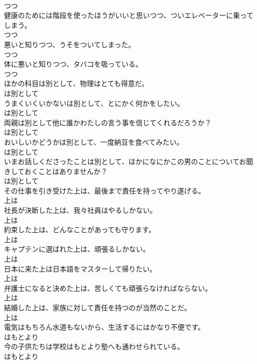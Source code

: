 \documentclass[8pt]{extreport}
\begin{document}
\begin{CJK}{UTF8}{min}
\\	つつ	
\\	健康のためには階段を使ったほうがいいと思いつつ、ついエレベーターに乗ってしまう。	
\\	つつ	
\\	悪いと知りつつ、うそをついてしまった。	
\\	つつ	
\\	体に悪いと知りつつ、タバコを吸っている。	
\\	つつ	
\\	ほかの科目は別として、物理はとても得意だ。	
\\	は別として	
\\	うまくいくいかないは別として、とにかく何かをしたい。	
\\	は別として	
\\	両親は別として他に誰かわたしの言う事を信じてくれるだろうか？	
\\	は別として	
\\	おいしいかどうかは別として、一度納豆を食べてみたい。	
\\	は別として	
\\	いまお話しくださったことは別として、ほかになにかこの男のことについてお聞きしておくことはありませんか？	
\\	は別として	
\\	その仕事を引き受けた上は、最後まで責任を持ってやり遂げる。	
\\	上は	
\\	社長が決断した上は、我々社員はやるしかない。	
\\	上は	
\\	約束した上は、どんなことがあっても守ります。	
\\	上は	
\\	キャプテンに選ばれた上は、頑張るしかない。	
\\	上は	
\\	日本に来た上は日本語をマスターして帰りたい。	
\\	上は	
\\	弁護士になると決めた上は、苦しくても頑張らなければならない。	
\\	上は	
\\	結婚した上は、家族に対して責任を持つのが当然のことだ。	
\\	上は	
\\	電気はもちろん水道もないから、生活するにはかなり不便です。	
\\	はもとより	
\\	今の子供たちは学校はもとより塾へも通わせられている。	
\\	はもとより	

\end{CJK}
\end{document}
